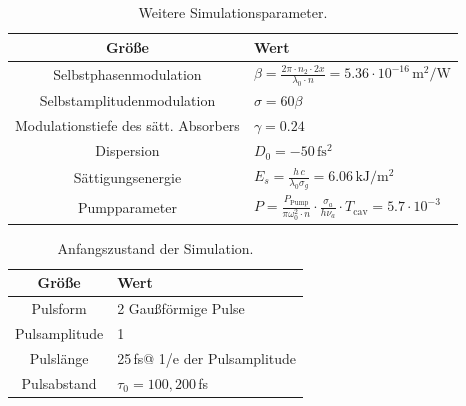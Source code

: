 \documentclass[bachelor,       %
               twoside,        %
               BCOR10mm,       %
               liststotoc,nomtotoc,bibtotoc, %
               english,ngerman, %
               final,          %
               ]{GAUBM}
\begin{document}

\begin{table}[!htb]
	\centering
	\begin{tabular}{|c|l|}
		\hline
		Größe & Wert\\
		\hline
		Selbstphasenmodulation & $\beta=\frac{2\pi\cdot n_2\cdot 2x}{\lambda_0\cdot n}=5.36\cdot 10^{-16}\,\si{\meter^2\per\watt}$\\
		Selbstamplitudenmodulation & $\sigma=60 \beta$\\
		Modulationstiefe des sätt. Absorbers & $\gamma=0.24$\\
		Dispersion & $D_0=-50\,\si{\femto\second^2}$\\
		Sättigungsenergie & $E_s=\frac{h\,c}{\lambda_0\sigma_g}= 6.06\,\si{\kilo\joule\per\meter^2}$\\
		Pumpparameter & $P=\frac{P_\text{Pump}}{\pi\omega_0^2\cdot n}\cdot\frac{\sigma_a}{h\nu_a}\cdot T_\text{cav}=5.7\cdot 10^{-3}$\\
		\hline
	\end{tabular}
	\caption{Weitere Simulationsparameter.}
	\label{tab:SimParam2}
\end{table}


\begin{table}[!htb]
	\centering
	\begin{tabular}{|c|l|}
		\hline
		Größe & Wert\\
		\hline	
		Pulsform & 2 Gaußförmige Pulse\\
		Pulsamplitude & 1\\
		Pulslänge & 25\,fs\quad @ 1/e der Pulsamplitude\\
		Pulsabstand & $\tau_0=100,200\,$fs\\
		\hline
	\end{tabular}
	\caption{Anfangszustand der Simulation.}
	\label{tab:SimParamStart}
\end{table}
\end{document}
